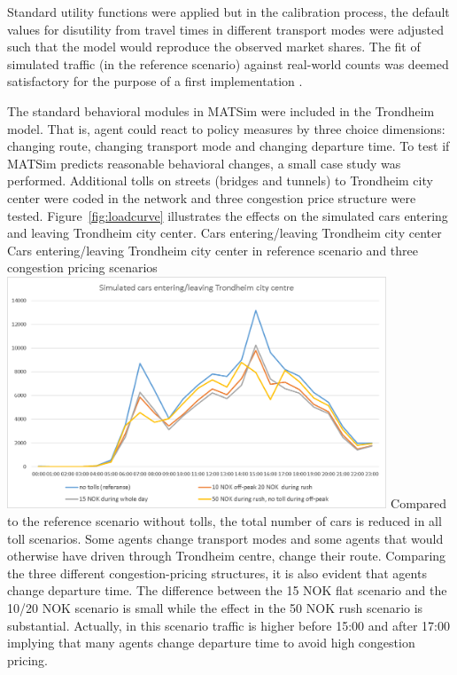 Standard utility functions were applied but in the calibration process, the default values for disutility from travel times in different transport modes were adjusted such that the model would reproduce the observed market shares. The fit of simulated traffic (in the reference scenario) against real-world counts was deemed satisfactory for the purpose of a first implementation \citep[][]{Bockemuehl_TechRep_UH_2014}. 

The standard behavioral modules in MATSim were included in the Trondheim model. That is, agent could react to policy measures by three choice dimensions: changing route, changing transport mode and changing departure time. To test if MATSim predicts reasonable behavioral changes, a small case study was performed. Additional tolls on streets (bridges and tunnels) to Trondheim city center were coded in the network and three congestion price structure were tested. Figure~\ref{fig:loadcurve} illustrates the effects on the simulated cars entering and leaving Trondheim city center. 
%
\createfigure%
{Cars entering/leaving Trondheim city center}%
{Cars entering/leaving Trondheim city center in reference scenario and three congestion pricing scenarios \citep[source][]{Bockemuehl_TechRep_UH_2014}}%
{\label{fig:loadcurve}}%
{\includegraphics[width=0.85\textwidth, angle=0]{./using/figures/trondheimloadcurve.png}}%
{}
%
Compared to the reference scenario without tolls, the total number of cars is reduced in all toll scenarios. Some agents change transport modes and some agents that would otherwise have driven through Trondheim centre, change their route. Comparing the three different congestion-pricing structures, it is also evident that agents change departure time. The difference between the 15 NOK flat scenario and the 10/20 NOK scenario is small while the effect in the 50 NOK rush scenario is substantial. Actually, in this scenario traffic is higher before 15:00 and after 17:00 implying that many agents change departure time to avoid high congestion pricing.  











